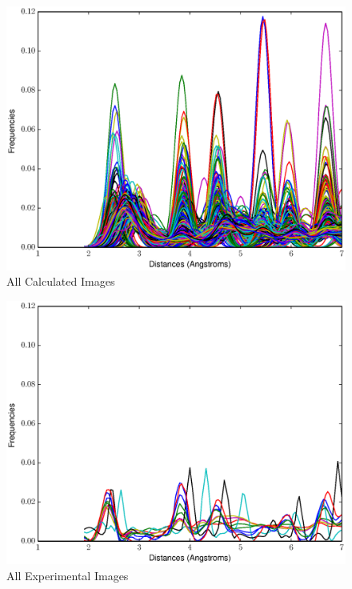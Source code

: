 \documentclass[12pt,letterpaper]{article}
\begin{document}
\begin{figure}[ht]
  \begin{center}
    \includegraphics[scale=0.7]{figs/AllCalcImages.eps}
    \caption{All Calculated Images}
  \end{center}
\end{figure}

\begin{figure}[ht]
  \begin{center}
    \includegraphics[scale=0.7]{figs/AllExptImages.eps}
    \caption{All Experimental Images}
  \end{center}
\end{figure}
\end{document}
